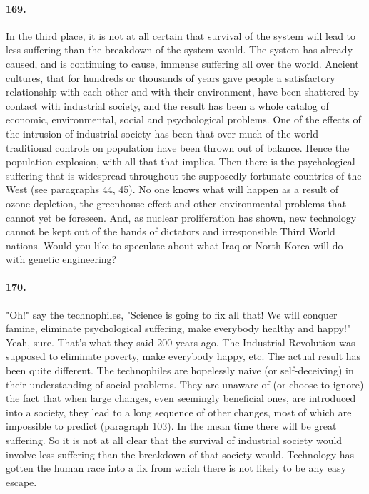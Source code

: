 \documentclass[12pt]{book}
\begin{document}
\paragraph{169.}  In the third place, it is not at all certain that survival of the system will lead to less suffering than the breakdown of the system would. The system has already caused, and is continuing to cause, immense suffering all over the world. Ancient cultures, that for hundreds or thousands of years gave people a satisfactory relationship with each other and with their environment, have been shattered by contact with industrial society, and the result has been a whole catalog of economic, environmental, social and psychological problems. One of the effects of the intrusion of industrial society has been that over much of the world traditional controls on population have been thrown out of balance. Hence the population explosion, with all that that implies. Then there is the psychological suffering that is widespread throughout the supposedly fortunate countries of the West (see paragraphs 44, 45). No one knows what will happen as a result of ozone depletion, the greenhouse effect and other environmental problems that cannot yet be foreseen. And, as nuclear proliferation has shown, new technology cannot be kept out of the hands of dictators and irresponsible Third World nations. Would you like to speculate about what Iraq or North Korea will do with genetic engineering?


\paragraph{170.}  "Oh!" say the technophiles, "Science is going to fix all that! We will conquer famine, eliminate psychological suffering, make everybody healthy and happy!" Yeah, sure. That's what they said 200 years ago. The Industrial Revolution was supposed to eliminate poverty, make everybody happy, etc. The actual result has been quite different. The technophiles are hopelessly naive (or self-deceiving) in their understanding of social problems. They are unaware of (or choose to ignore) the fact that when large changes, even seemingly beneficial ones, are introduced into a society, they lead to a long sequence of other changes, most of which are impossible to predict (paragraph 103). In the mean time there will be great suffering. So it is not at all clear that the survival of industrial society would involve less suffering than the breakdown of that society would. Technology has gotten the human race into a fix from which there is not likely to be any easy escape.
\end{document}
